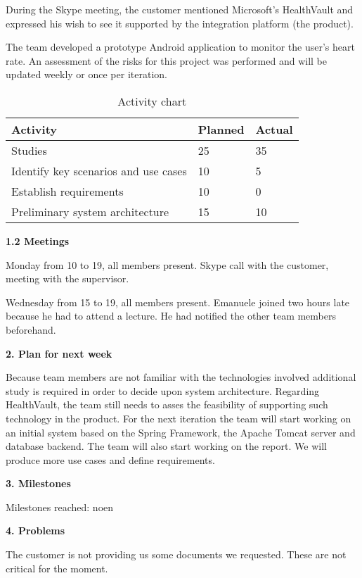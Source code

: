 During the Skype meeting, the customer mentioned Microsoft’s  HealthVault and expressed his wish to see it supported by the integration platform (the product).

The team developed a prototype Android application to monitor the user’s heart rate. An assessment of the risks for this project was performed and will be updated weekly or once per iteration.

\begin{table}[H]
\begin{center}
\begin{tabular}{ l | l | l }
  \hline
  Activity & Planned & Actual \\
  \hline\noalign{\smallskip}\noalign{\smallskip}\hline
  Studies & 25 & 35 \\
  Identify key scenarios and use cases & 10 & 5 \\
  Establish requirements & 10 & 0 \\
  Preliminary system architecture & 15 & 10 \\
  \hline
\end{tabular}
\end{center}
\caption{Activity chart}
\label{table:activityChartStatusReportWeek36}
\end{table}

\textbf{1.2 Meetings}

Monday
from 10 to 19, all members present.
Skype call with the customer, meeting with the supervisor.

Wednesday
from 15 to 19, all members present. Emanuele joined two hours late because he had to attend a lecture. 
He had notified the other team members beforehand.

\textbf{2. Plan for next week}

Because team members are not familiar with the technologies involved  additional study is required in order to decide upon system architecture.
Regarding HealthVault, the team still needs to asses the feasibility of supporting such technology in the product. 
For the next iteration the team will start working on an initial system based on the Spring Framework, the Apache Tomcat server and database backend. 
The team will also start working on the report. 
We will produce more use cases and define requirements.

\textbf{3. Milestones}

Milestones reached: noen

\textbf{4. Problems}

The customer is not providing us some documents we requested.
These are not critical for the moment.


